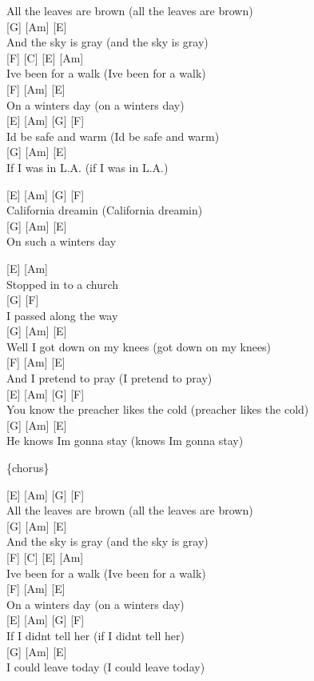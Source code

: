 \documentclass[
  letterpaper,
]{scrbook}
\begin{document}
All the leaves are brown (all the leaves are brown)\\
{[}G{]} {[}Am{]} {[}E{]}\\
And the sky is gray (and the sky is gray)\\
{[}F{]} {[}C{]} {[}E{]} {[}Am{]}\\
I\textquotesingle ve been for a walk (I\textquotesingle ve been for a
walk)\\
{[}F{]} {[}Am{]} {[}E{]}\\
On a winter\textquotesingle s day (on a winter\textquotesingle s day)\\
{[}E{]} {[}Am{]} {[}G{]} {[}F{]}\\
I\textquotesingle d be safe and warm (I\textquotesingle d be safe and
warm)\\
{[}G{]} {[}Am{]} {[}E{]}\\
If I was in L.A. (if I was in L.A.)

{[}E{]} {[}Am{]} {[}G{]} {[}F{]}\\
California dreamin (California dreamin\textquotesingle)\\
{[}G{]} {[}Am{]} {[}E{]}\\
On such a winter\textquotesingle s day

{[}E{]} {[}Am{]}\\
Stopped in to a church\\
{[}G{]} {[}F{]}\\
I passed along the way\\
{[}G{]} {[}Am{]} {[}E{]}\\
Well I got down on my knees (got down on my knees)\\
{[}F{]} {[}Am{]} {[}E{]}\\
And I pretend to pray (I pretend to pray)\\
{[}E{]} {[}Am{]} {[}G{]} {[}F{]}\\
You know the preacher likes the cold (preacher likes the cold)\\
{[}G{]} {[}Am{]} {[}E{]}\\
He knows I\textquotesingle m gonna stay (knows I\textquotesingle m gonna
stay)

\{chorus\}

{[}E{]} {[}Am{]} {[}G{]} {[}F{]}\\
All the leaves are brown (all the leaves are brown)\\
{[}G{]} {[}Am{]} {[}E{]}\\
And the sky is gray (and the sky is gray)\\
{[}F{]} {[}C{]} {[}E{]} {[}Am{]}\\
I\textquotesingle ve been for a walk (I\textquotesingle ve been for a
walk)\\
{[}F{]} {[}Am{]} {[}E{]}\\
On a winter\textquotesingle s day (on a winter\textquotesingle s day)\\
{[}E{]} {[}Am{]} {[}G{]} {[}F{]}\\
If I didn\textquotesingle t tell her (if I didn\textquotesingle t tell
her)\\
{[}G{]} {[}Am{]} {[}E{]}\\
I could leave today (I could leave today)
\end{document}
